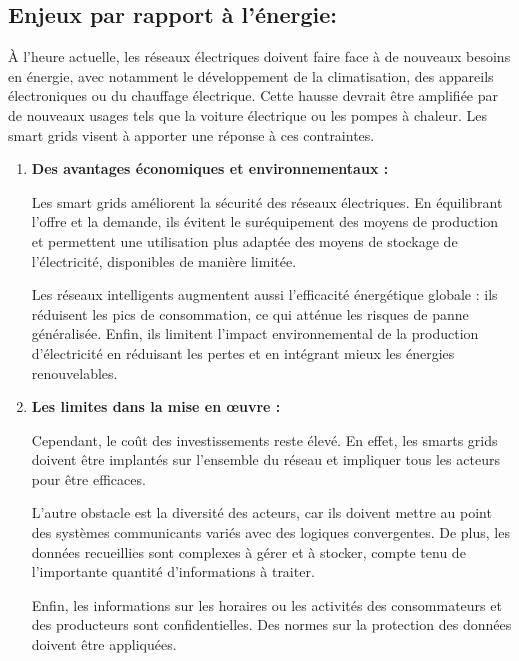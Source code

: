 \subsection{Enjeux par rapport à l'énergie:}

À l’heure actuelle, les réseaux électriques doivent faire face à de nouveaux besoins en énergie, avec notamment le développement de la climatisation, des appareils électroniques ou du chauffage électrique. Cette hausse devrait être amplifiée par de nouveaux usages tels que la voiture électrique ou les pompes à chaleur. Les smart grids visent à apporter une réponse à ces contraintes.

\begin{enumerate}
\item \textbf{Des avantages économiques et environnementaux :}

Les smart grids améliorent la sécurité des réseaux électriques. En équilibrant l’offre et la demande, ils évitent le suréquipement des moyens de production et permettent une utilisation plus adaptée des moyens de stockage de l’électricité, disponibles de manière limitée.

Les réseaux intelligents augmentent aussi l’efficacité énergétique globale : ils réduisent les pics de consommation, ce qui atténue les risques de panne généralisée.
Enfin, ils limitent l’impact environnemental de la production d’électricité en réduisant les pertes et en intégrant mieux les énergies renouvelables.

\item \textbf{Les limites dans la mise en œuvre :}

Cependant, le coût des investissements reste élevé. En effet, les smarts grids doivent être implantés sur l’ensemble du réseau et impliquer tous les acteurs pour être efficaces.

L’autre obstacle est la diversité des acteurs, car ils doivent mettre au point des systèmes communicants variés avec des logiques convergentes. De plus, les données recueillies sont complexes à gérer et à stocker, compte tenu de l’importante quantité d’informations à traiter. 

Enfin, les informations sur les horaires ou les activités des consommateurs et des producteurs  sont confidentielles.  Des normes sur la protection des données doivent être appliquées. 
\end{enumerate}